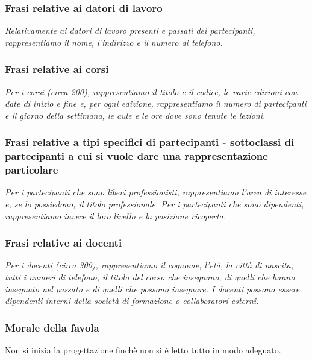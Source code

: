 \subsubsection{Frasi relative ai datori di lavoro}
\textit{Relativamente ai datori di lavoro presenti e passati dei partecipanti, rappresentiamo il nome, l'indirizzo e il numero di telefono.}
\subsubsection{Frasi relative ai corsi}
\textit{Per i corsi (circa 200), rappresentiamo il titolo e il codice, le varie edizioni con date di inizio e fine e, per ogni edizione, rappresentiamo il numero di partecipanti e il giorno della settimana, le aule e le ore dove sono tenute le lezioni.}
\subsubsection{Frasi relative a tipi specifici di partecipanti - sottoclassi di partecipanti a cui si vuole dare una rappresentazione particolare}
\textit{Per i partecipanti che sono liberi professionisti, rappresentiamo l'area di interesse e, se lo possiedono, il titolo professionale. Per i partecipanti che sono dipendenti, rappresentiamo invece il loro livello e la posizione ricoperta.}
\subsubsection{Frasi relative ai docenti}
\textit{Per i docenti (circa 300), rappresentiamo il cognome, l'età, la città di nascita, tutti i numeri di telefono, il titolo del corso che insegnano, di quelli che hanno insegnato nel passato e di quelli che possono insegnare. I docenti possono essere dipendenti interni della società di formazione o collaboratori esterni.}
\subsubsection{Morale della favola}
Non si inizia la progettazione finchè non si è letto tutto in modo adeguato.
